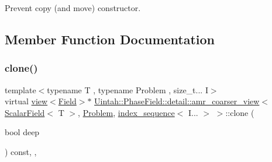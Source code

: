 Prevent copy (and move) constructor. 



\subsection{Member Function Documentation}
\mbox{\label{classUintah_1_1PhaseField_1_1detail_1_1amr__coarser__view_3_01ScalarField_3_01T_01_4_00_01Proble9cadea116dab5bdb44bb3e29abbe99ef_a125db112d5568827ed202d5e02610515}} 
\subsubsection{\texorpdfstring{clone()}{clone()}\hspace{0.1cm}{\footnotesize\ttfamily [1/2]}}
{\footnotesize\ttfamily template$<$typename T , typename Problem , size\+\_\+t... I$>$ \\
virtual \hyperlink{classUintah_1_1PhaseField_1_1detail_1_1view}{view}$<$\hyperlink{structUintah_1_1PhaseField_1_1ScalarField}{Field}$>$$\ast$ \hyperlink{classUintah_1_1PhaseField_1_1detail_1_1amr__coarser__view}{Uintah\+::\+Phase\+Field\+::detail\+::amr\+\_\+coarser\+\_\+view}$<$ \hyperlink{structUintah_1_1PhaseField_1_1ScalarField}{Scalar\+Field}$<$ T $>$, \hyperlink{classUintah_1_1PhaseField_1_1Problem}{Problem}, \hyperlink{namespaceUintah_1_1PhaseField_a237de804d99512e50613aff7c94a9461}{index\+\_\+sequence}$<$ I... $>$ $>$\+::clone (\begin{DoxyParamCaption}\item[{bool}]{deep }\end{DoxyParamCaption}) const\hspace{0.3cm}{\ttfamily [inline]}, {\ttfamily [override]}, {\ttfamily [virtual]}}




